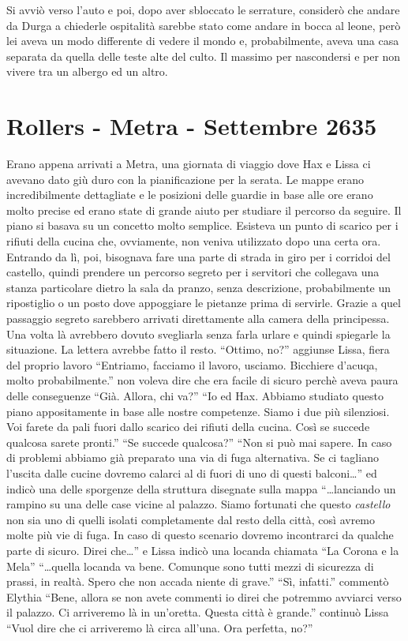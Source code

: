     Si avviò verso l'auto e poi, dopo aver sbloccato le serrature,
    considerò che andare da Durga a chiederle ospitalità sarebbe stato come
    andare in bocca al leone, però lei aveva un modo differente di vedere
    il mondo e, probabilmente, aveva una casa separata da quella delle
    teste alte del culto. Il massimo per nascondersi e per non vivere tra
    un albergo ed un altro.

  \section{Rollers - Metra - Settembre 2635}

    Erano appena arrivati a Metra, una giornata di viaggio dove Hax e Lissa
    ci avevano dato giù duro con la pianificazione per la serata. Le mappe
    erano incredibilmente dettagliate e le posizioni delle guardie in base
    alle ore erano molto precise ed erano state di grande aiuto per
    studiare il percorso da seguire. Il piano si basava su un concetto
    molto semplice. Esisteva un punto di scarico per i rifiuti della
    cucina che, ovviamente, non veniva utilizzato dopo una certa ora.
    Entrando da lì, poi, bisognava fare una parte di strada in giro per i
    corridoi del castello, quindi prendere un percorso segreto per i
    servitori che collegava una stanza particolare dietro la sala da
    pranzo, senza descrizione, probabilmente un ripostiglio o un posto dove
    appoggiare le pietanze prima di servirle. Grazie a quel passaggio
    segreto sarebbero arrivati direttamente alla camera della principessa.
    Una volta là avrebbero dovuto svegliarla senza farla urlare e quindi
    spiegarle la situazione. La lettera avrebbe fatto il resto. ``Ottimo,
    no?'' aggiunse Lissa, fiera del proprio lavoro ``Entriamo, facciamo il
    lavoro, usciamo. Bicchiere d'acuqa, molto probabilmente.'' non voleva
    dire che era facile di sicuro perchè aveva paura delle conseguenze
    ``Già. Allora, chi va?'' ``Io ed Hax. Abbiamo studiato questo piano
    appositamente in base alle nostre competenze. Siamo i due più
    silenziosi. Voi farete da pali fuori dallo scarico dei rifiuti della
    cucina. Così se succede qualcosa sarete pronti.'' ``Se succede
    qualcosa?'' ``Non si può mai sapere. In caso di problemi abbiamo già
    preparato una via di fuga alternativa. Se ci tagliano l'uscita dalle
    cucine dovremo calarci al di fuori di uno di questi balconi\dots{}'' ed indicò
    una delle sporgenze della struttura disegnate sulla mappa
    ``\dots{}lanciando un rampino su una delle case vicine al palazzo.
    Siamo fortunati che questo \emph{castello} non sia uno di quelli
    isolati completamente dal resto della città, così avremo molte più vie
    di fuga. In caso di questo scenario dovremo incontrarci da qualche
    parte di sicuro. Direi che\dots{}'' e Lissa indicò una locanda chiamata
    ``La Corona e la Mela'' ``\dots{}quella locanda va bene. Comunque sono
    tutti mezzi di sicurezza di prassi, in realtà. Spero che non accada
    niente di grave.'' ``Sì, infatti.'' commentò Elythia ``Bene, allora se
    non avete commenti io direi che potremmo avviarci verso il palazzo. Ci
    arriveremo là in un'oretta. Questa città è grande.'' continuò Lissa
    ``Vuol dire che ci arriveremo là circa all'una. Ora perfetta, no?''

